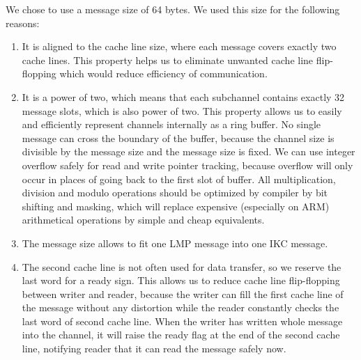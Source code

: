 \documentclass[a4paper,10pt]{article}
\begin{document}
	We chose to use a message size of 64 bytes. 
	We used this size for the following reasons:
	\begin{enumerate}
		\item It is aligned to the cache line size, where each message covers exactly two cache lines. 
		This property helps us to eliminate unwanted cache line flip-flopping which would reduce efficiency of communication.
		\item It is a power of two, which means that each subchannel contains exactly 32 message slots, which is also power of two. 
		This property allows us to easily and efficiently represent channels internally as a ring buffer.
		No single message can cross the boundary of the buffer, because the channel size is divisible by the message size and the message size is fixed.
		We can use integer overflow safely for read and write pointer tracking, because overflow will only occur in places of going back to the first slot of buffer. %
		All multiplication, division and modulo operations should be optimized by compiler by bit shifting and masking, which will replace expensive (especially on ARM) arithmetical operations by simple and cheap equivalents.
		\item The message size allows to fit one LMP message into one IKC message.
		\item The second cache line is not often used for data transfer, so we reserve the last word for a ready sign.
		This allows us to reduce cache line flip-flopping between writer and reader, because the writer can fill the first cache line of the message without any distortion while the reader constantly checks the last word of second cache line. 
		When the writer has written whole message into the channel, it will raise the ready flag at the end of the second cache line, notifying reader that it can read the message safely now.
	\end{enumerate}
	
\end{document}
